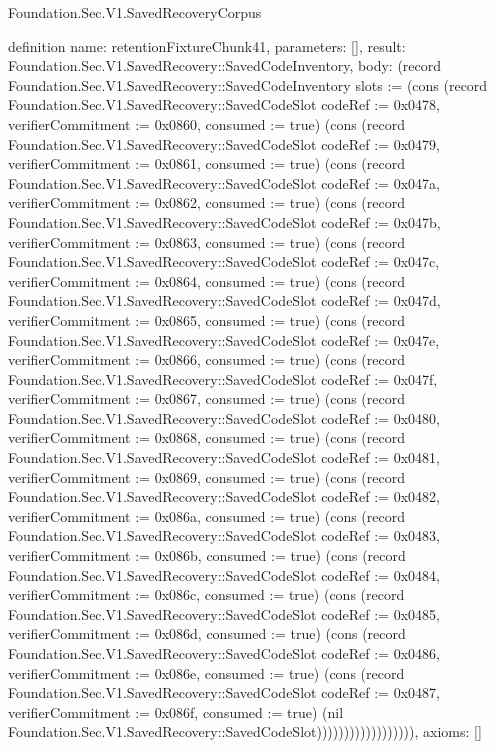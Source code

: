 \begin{lexlean}{Foundation.Sec.V1.SavedRecoveryCorpus}
\begin{semanticmodule}
definition{
  name: retentionFixtureChunk41,
  parameters: [],
  result: Foundation.Sec.V1.SavedRecovery::SavedCodeInventory,
  body: (record Foundation.Sec.V1.SavedRecovery::SavedCodeInventory {slots := (cons (record Foundation.Sec.V1.SavedRecovery::SavedCodeSlot {codeRef := 0x0478, verifierCommitment := 0x0860, consumed := true}) (cons (record Foundation.Sec.V1.SavedRecovery::SavedCodeSlot {codeRef := 0x0479, verifierCommitment := 0x0861, consumed := true}) (cons (record Foundation.Sec.V1.SavedRecovery::SavedCodeSlot {codeRef := 0x047a, verifierCommitment := 0x0862, consumed := true}) (cons (record Foundation.Sec.V1.SavedRecovery::SavedCodeSlot {codeRef := 0x047b, verifierCommitment := 0x0863, consumed := true}) (cons (record Foundation.Sec.V1.SavedRecovery::SavedCodeSlot {codeRef := 0x047c, verifierCommitment := 0x0864, consumed := true}) (cons (record Foundation.Sec.V1.SavedRecovery::SavedCodeSlot {codeRef := 0x047d, verifierCommitment := 0x0865, consumed := true}) (cons (record Foundation.Sec.V1.SavedRecovery::SavedCodeSlot {codeRef := 0x047e, verifierCommitment := 0x0866, consumed := true}) (cons (record Foundation.Sec.V1.SavedRecovery::SavedCodeSlot {codeRef := 0x047f, verifierCommitment := 0x0867, consumed := true}) (cons (record Foundation.Sec.V1.SavedRecovery::SavedCodeSlot {codeRef := 0x0480, verifierCommitment := 0x0868, consumed := true}) (cons (record Foundation.Sec.V1.SavedRecovery::SavedCodeSlot {codeRef := 0x0481, verifierCommitment := 0x0869, consumed := true}) (cons (record Foundation.Sec.V1.SavedRecovery::SavedCodeSlot {codeRef := 0x0482, verifierCommitment := 0x086a, consumed := true}) (cons (record Foundation.Sec.V1.SavedRecovery::SavedCodeSlot {codeRef := 0x0483, verifierCommitment := 0x086b, consumed := true}) (cons (record Foundation.Sec.V1.SavedRecovery::SavedCodeSlot {codeRef := 0x0484, verifierCommitment := 0x086c, consumed := true}) (cons (record Foundation.Sec.V1.SavedRecovery::SavedCodeSlot {codeRef := 0x0485, verifierCommitment := 0x086d, consumed := true}) (cons (record Foundation.Sec.V1.SavedRecovery::SavedCodeSlot {codeRef := 0x0486, verifierCommitment := 0x086e, consumed := true}) (cons (record Foundation.Sec.V1.SavedRecovery::SavedCodeSlot {codeRef := 0x0487, verifierCommitment := 0x086f, consumed := true}) (nil Foundation.Sec.V1.SavedRecovery::SavedCodeSlot)))))))))))))))))}),
  axioms: []
}


\end{semanticmodule}
\end{lexlean}
